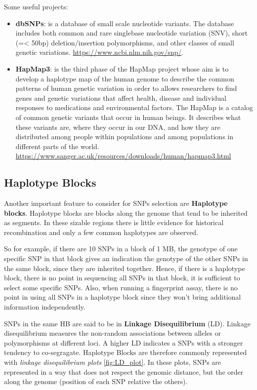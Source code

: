 
\bigskip
Some useful projects:
\begin{itemize}
	\item \textbf{dbSNPs}: is a database of small scale nucleotide variants. The
	database includes both common and rare singlebase nucleotide variation
	(SNV), short (=< 50bp) deletion/insertion polymorphisms, and other classes
	of small genetic variations. \url{https://www.ncbi.nlm.nih.gov/snp/}.
	
	\item \textbf{HapMap3}: is the third phase of the HapMap project whose aim
	is to develop a haplotype map of the human genome to describe the common
	patterns of human genetic variation in order to allows researchers to find
	genes and genetic variations that affect health, disease and individual
	responses to medications and environmental factors. The HapMap is a catalog
	of common genetic variants that occur in human beings. It describes what
	these variants are, where they occur in our DNA, and how they are
	distributed among people within populations and among populations in
	different parts of the world.
	\url{https://www.sanger.ac.uk/resources/downloads/human/hapmap3.html}
\end{itemize}

\subsection{Haplotype Blocks}

Another important feature to consider for SNPs selection are \textbf{Haplotype
blocks}. Haplotype blocks are blocks along the genome that tend to be inherited
as segments. In these sizable regions there is little evidence for historical
recombination and only a few common haplotypes are observed. 

So for example, if there are 10 SNPs in a block of 1 MB, the genotype of one
specific SNP in that block gives an indication the genotype of the other SNPs in
the same block, since they are inherited together. Hence, if there is a
haplotype block, there is no point in sequencing all SNPs in that block, it is
sufficient to select some specific SNPs. Also, when running a fingerprint assay,
there is no point in using all SNPs in a haplotype block since they won't bring
additional information independently.

SNPs in the same HB are said to be in \textbf{Linkage Disequilibrium} (LD).
Linkage disequilibrium measures the non-random associations between alleles or
polymorphisms at different loci. A higher LD indicates a SNPs with a stronger
tendency to co-segragate. Haplotype Blocks are therefore commonly represented
with \emph{linkage disequilibrium plots} \ref{fig:LD_plot}. In these plots, SNPs
are represented in a way that does not respect the genomic distance, but the
order along the genome (position of each SNP relative the others). \\

